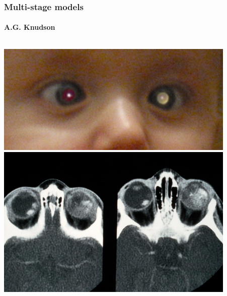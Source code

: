 \documentclass{beamer}
\begin{document}
\begin{frame}
\end{frame}

\begin{frame}
    \frametitle{Multi-stage models}
    \framesubtitle{A.G. Knudson\footnotemark[12]}

    \begin{columns}
        \begin{column}{0.5\textwidth}
            \includegraphics[width=0.90\textwidth]{figures/Rb_whiteeye.PNG}
            \;
            \includegraphics[width=0.90\textwidth]{figures/retinoblastoma.jpg}
        \end{column}
        \begin{column}{0.5\textwidth}

\end{column}
\end{columns}
\end{frame}
\end{document}
